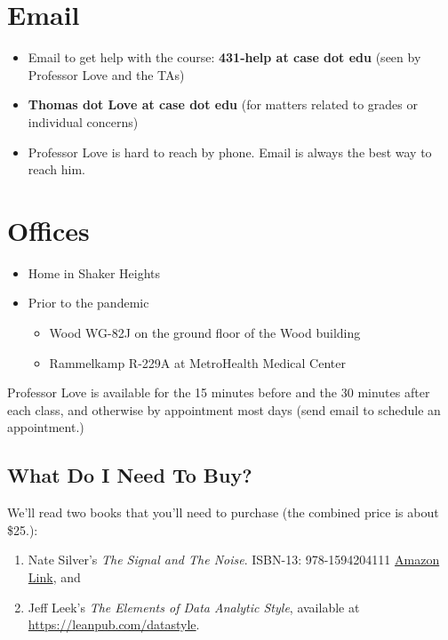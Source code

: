 \documentclass[
]{book}
\providecommand{\tightlist}{%
  \setlength{\itemsep}{0pt}\setlength{\parskip}{0pt}}
\begin{document}
\hypertarget{email}{%
\section{Email}\label{email}}

\begin{itemize}
\tightlist
\item
  Email to get help with the course: \textbf{431-help at case dot edu} (seen by Professor Love and the TAs)
\item
  \textbf{Thomas dot Love at case dot edu} (for matters related to grades or individual concerns)
\item
  Professor Love is hard to reach by phone. Email is always the best way to reach him.
\end{itemize}

\hypertarget{offices}{%
\section{Offices}\label{offices}}

\begin{itemize}
\tightlist
\item
  Home in Shaker Heights
\item
  Prior to the pandemic

  \begin{itemize}
  \tightlist
  \item
    Wood WG-82J on the ground floor of the Wood building
  \item
    Rammelkamp R-229A at MetroHealth Medical Center
  \end{itemize}
\end{itemize}

Professor Love is available for the 15 minutes before and the 30 minutes after each class, and otherwise by appointment most days (send email to schedule an appointment.)

\hypertarget{what-do-i-need-to-buy}{%
\subsection*{What Do I Need To Buy?}\label{what-do-i-need-to-buy}}

We'll read two books that you'll need to purchase (the combined price is about \$25.):

\begin{enumerate}
\def\labelenumi{\arabic{enumi}.}
\tightlist
\item
  Nate Silver's \emph{The Signal and The Noise}. ISBN-13: 978-1594204111 \href{https://www.amazon.com/Signal-Noise-Many-Predictions-Fail-but/dp/0143125087}{Amazon Link}, and
\item
  Jeff Leek's \emph{The Elements of Data Analytic Style}, available at \url{https://leanpub.com/datastyle}.
\end{enumerate}
\end{document}

